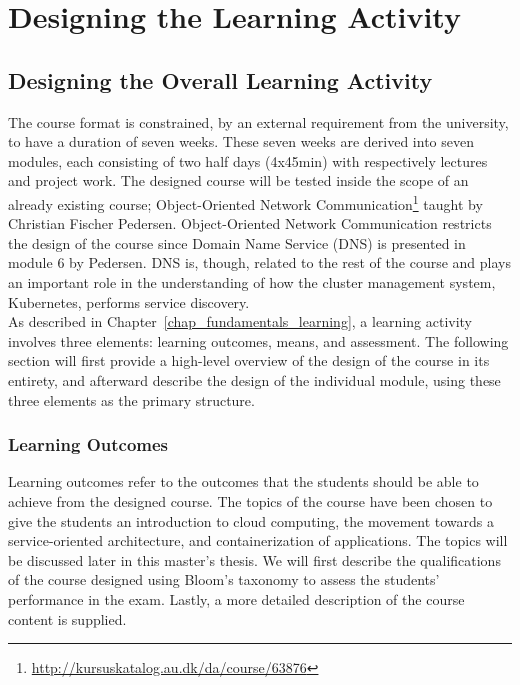 \chapter{Designing the Learning Activity}
\label{chap:designing_learning_acitivty}




\section{Designing the Overall Learning Activity}

The course format is constrained, by an external requirement from the university, to have a duration of seven weeks. These seven weeks are derived into seven modules, each consisting of two half days (4x45min) with respectively lectures and project work. The designed course will be tested inside the scope of an already existing course; Object-Oriented Network Communication\footnote{\url{http://kursuskatalog.au.dk/da/course/63876}} taught by Christian Fischer Pedersen. Object-Oriented Network Communication restricts the design of the course since Domain Name Service (DNS) is presented in module 6 by Pedersen. DNS is, though, related to the rest of the course and plays an important role in the understanding of how the cluster management system, Kubernetes, performs service discovery. \\

\noindent 
As described in Chapter~\ref{chap_fundamentals_learning}, a learning activity involves three elements: learning outcomes, means, and assessment. The following section will first provide a high-level overview of the design of the course in its entirety, and afterward describe the design of the individual module, using these three elements as the primary structure.

\subsection*{Learning Outcomes}
Learning outcomes refer to the outcomes that the students should be able to achieve from the designed course. The topics of the course have been chosen to give the students an introduction to cloud computing, the movement towards a service-oriented architecture, and containerization of applications. The topics will be discussed later in this master's thesis. We will first describe the qualifications of the course designed using Bloom's taxonomy to assess the students' performance in the exam. Lastly, a more detailed description of the course content is supplied.

